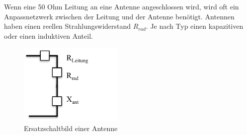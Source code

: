 
Wenn eine 50 Ohm Leitung an eine Antenne angeschlossen wird,  wird oft ein Anpassnetzwerk zwischen der Leitung und der Antenne benötigt.  Antennen haben einen  reellen Strahlungswiderstand $R_{rad}$. Je nach Typ einen kapazitiven oder einen induktiven Anteil.
\begin{figure}[!htb]
	\centering
	\includegraphics[width=5cm]{content/bilder/ESB_Antenne.pdf}%
	\caption{Ersatzschaltbild einer Antenne}
	\label{ESBantenne}
\end{figure}





